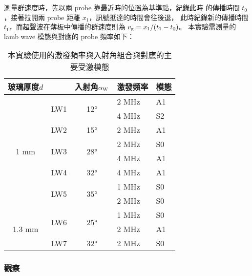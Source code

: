 \documentclass[10pt]{report}
\begin{document}
 測量群速度時，先以兩 probe 靠最近時的位置為基準點，紀錄此時
的傳播時間 $t_0$，接著拉開兩 probe 距離 $x_1$，訊號抵達的時間會往後退，
此時紀錄新的傳播時間 $t_1$，而超聲波在薄板中傳播的群速度則為 $v_{\rm g}= 
x_1/(t_1-t_0)$。
 本實驗需測量的 lamb wave 模態與對應的 probe 頻率如下：
\begin{table}[ht]
\centering
\caption{本實驗使用的激發頻率與入射角組合與對應的主要受激模態}
\label{tab:my-table}
\begin{tabular}{@{}cccll@{}}
\toprule
\multicolumn{1}{l}{玻璃厚度$d$} & \multicolumn{1}{l}{}    & 入射角$\alpha_{\rm W}$                  & 激發頻率 & 模態 \\ \midrule
\multirow{8}{*}{1 mm}    & \multirow{2}{*}{LW1}    & \multirow{2}{*}{12°} & 2 MHz         & A1     \\
                         &                         &                      & 4 MHz         & S2     \\ \cmidrule(l){2-5} 
                         & \multicolumn{1}{l}{LW2} & 15°                  & 2 MHz         & A1     \\ \cmidrule(l){2-5} 
                         & \multirow{2}{*}{LW3}    & \multirow{2}{*}{28°} & 2 MHz         & S0     \\
                         &                         &                      & 4 MHz         & A1     \\ \cmidrule(l){2-5} 
                         & \multicolumn{1}{l}{LW4} & 32°                  & 4 MHz         & A1     \\ \cmidrule(l){2-5} 
                         & \multirow{2}{*}{LW5}    & \multirow{2}{*}{35°} & 1 MHz         & S0     \\
                         &                         &                      & 2 MHz         & S0     \\ \midrule
\multirow{3}{*}{1.3 mm}  & \multirow{2}{*}{LW6}    & \multirow{2}{*}{25°} & 1 MHz         & S0     \\
                         &                         &                      & 2 MHz         & A1     \\ \cmidrule(l){2-5} 
                         & \multicolumn{1}{l}{LW7} & 32°                  & 2 MHz         & S0     \\ \bottomrule
\end{tabular}
\end{table}

\subsubsection{觀察}
\end{document}

